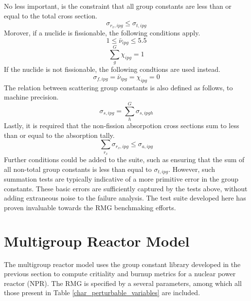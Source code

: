 No less important, is the constraint that all group constants are less than or equal to 
the total cross section.
\begin{equation}
\label{tot_xs_ut}
\sigma_{r_x,ipg} \le \sigma_{t,ipg}
\end{equation}
Morover, if a nuclide is fissionable, the following conditions apply.
\begin{equation}
\label{nu_fiss_ut}
1 \le \bar{\nu}_{ipg} \le 5.5
\end{equation}
\begin{equation}
\label{chi_fiss_ut}
\sum_g^G \chi_{ipg} = 1
\end{equation}
If the nuclide is not fissionable, the following condtions are used instead.
\begin{equation}
\label{not_fiss_ut}
\sigma_{f,ipg} = \bar{\nu}_{ipg} = \chi_{ipg} = 0
\end{equation}
The relation between scattering group constants is also defined as follows, to 
machine precision.
\begin{equation}
\label{scat_xs_ut}
\sigma_{s,ipg} = \sum_h^G \sigma_{s,ipgh}
\end{equation}
Lastly, it is required that the non-fission absorpotion cross sections sum 
to less than or equal to the absorption tally.
\begin{equation}
\label{scat_xs_ut}
\sum_{r_x} \sigma_{r_x,ipg} \le \sigma_{a,ipg}
\end{equation}
Further conditions could be added to the suite, such as ensuring that the sum of 
all non-total group constants is less than equal to $\sigma_{t,ipg}$.  However, 
such summation tests are typically indicative of a more primitive error in the 
group constants.  These basic errors are sufficiently captured by the tests above, 
without adding extraneous noise to the failure analysis.  The test suite developed
here has proven invaluable towards the RMG benchmaking efforts.




\section{Multigroup Reactor Model}
The multigroup reactor model uses the group constant library developed in the previous 
section to compute critiality and burnup metrics for a nuclear power reactor (NPR).
The RMG is specified by a several parameters, among which all those present in Table
\ref{char_perturbable_variables} are included.


